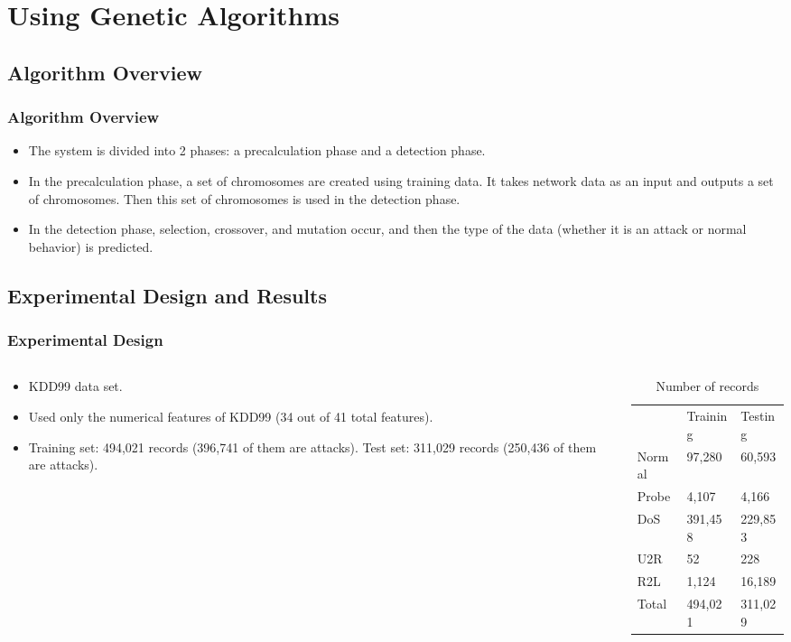 \documentclass{beamer}
\begin{document}
\section[Using Genetic Algorithms]{Using Genetic Algorithms}
\subsection{Algorithm Overview}
\begin{frame}
  \frametitle{Algorithm Overview}
	\begin{itemize}
		\item The system is divided into 2 phases: a precalculation phase and a detection phase.
		\item In the precalculation phase, a set of chromosomes are created using training data. It takes network data as an input and outputs a set of chromosomes. Then this set of chromosomes is used in the detection phase.
		\item In the detection phase, selection, crossover, and mutation occur, and then the type of the data (whether it is an attack or normal behavior) is predicted.
	\end{itemize}
\end{frame}


\subsection{Experimental Design and Results}
\begin{frame}
  \frametitle{Experimental Design}
  \begin{columns}

  \begin{column}{0.5\textwidth}
	\begin{itemize}
		\item KDD99 data set.
		\item Used only the numerical features of KDD99 (34 out of 41 total features).
		\item Training set: 494,021 records (396,741 of them are attacks). Test set: 311,029 records (250,436 of them are attacks).
	\end{itemize}
  \end{column}
  
  \begin{column}{0.5\textwidth}
  \begin{table}
\caption{Number of records}
\begin{tabular}{lll}
  & Training & Testing \\
Normal & 97,280 & 60,593\\
Probe & 4,107 & 4,166\\
DoS         & 391,458 & 229,853\\
U2R & 52 & 228\\
R2L & 1,124 & 16,189\\
Total & 494,021 & 311,029\\
\end{tabular}
\end{table}
  \end{column}
  \end{columns}
\end{frame}
\end{document}
